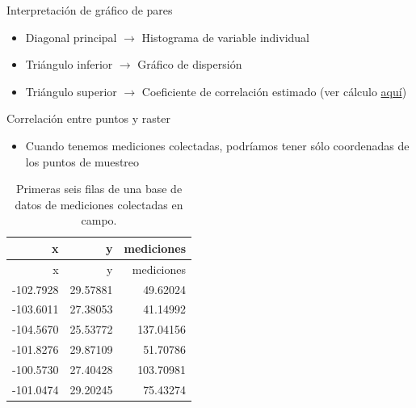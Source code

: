 \documentclass[
  11pt,
  ignorenonframetext,
]{beamer}
\providecommand{\tightlist}{%
  \setlength{\itemsep}{0pt}\setlength{\parskip}{0pt}}
\begin{document}
\begin{frame}{Interpretación de gráfico de pares}
\protect\hypertarget{interpretaciuxf3n-de-gruxe1fico-de-pares}{}
\begin{itemize}
\item
  Diagonal principal \(\rightarrow\) Histograma de variable individual
\item
  Triángulo inferior \(\rightarrow\) Gráfico de dispersión
\item
  Triángulo superior \(\rightarrow\) Coeficiente de correlación estimado
  (ver cálculo \href{Correlacion.pdf}{aquí})
\end{itemize}
\end{frame}

\begin{frame}{Correlación entre puntos y raster}
\protect\hypertarget{correlaciuxf3n-entre-puntos-y-raster}{}
\begin{itemize}
\tightlist
\item
  Cuando tenemos mediciones colectadas, podríamos tener sólo coordenadas
  de los puntos de muestreo
\end{itemize}

\begin{longtable}[]{@{}rrr@{}}
\caption{Primeras seis filas de una base de datos de mediciones
colectadas en campo.}\tabularnewline
\toprule()
x & y & mediciones \\
\midrule()
\endfirsthead
\toprule()
x & y & mediciones \\
\midrule()
\endhead
-102.7928 & 29.57881 & 49.62024 \\
-103.6011 & 27.38053 & 41.14992 \\
-104.5670 & 25.53772 & 137.04156 \\
-101.8276 & 29.87109 & 51.70786 \\
-100.5730 & 27.40428 & 103.70981 \\
-101.0474 & 29.20245 & 75.43274 \\
\bottomrule()
\end{longtable}
\end{frame}
\end{document}
